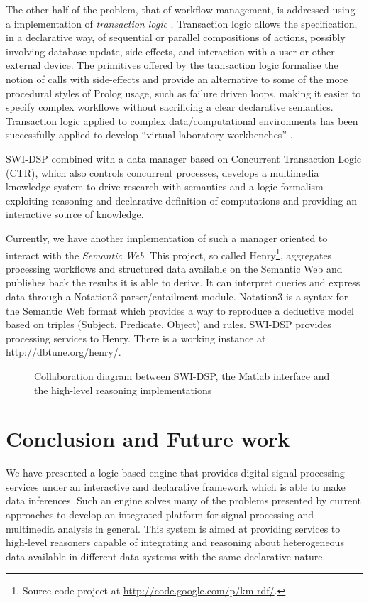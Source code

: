 \documentclass[runningheads]{llncs}
\begin{document}
The other half of the problem, that of workflow management, is addressed using a implementation of \emph{transaction logic} \cite{ctl}. Transaction logic allows the specification, in a declarative way, of sequential or parallel compositions of actions, possibly involving database update, side-effects, and interaction with a user or other external device. The primitives offered by the transaction logic formalise the notion of calls with side-effects and
provide an alternative to some of the more procedural styles of Prolog usage, such as failure driven loops, making it easier to specify complex workflows without sacrificing a clear declarative semantics. Transaction logic applied to complex data/computational environments has been successfully applied to develop ``virtual laboratory workbenches'' \cite{virtual}.

SWI-DSP combined with a data manager based on Concurrent Transaction Logic (CTR), which also controls concurrent processes, develops a multimedia knowledge system to drive research with semantics and a logic formalism exploiting reasoning and declarative definition of computations and providing an interactive source of knowledge.

Currently, we have another implementation of such a manager oriented to interact with the \textit{Semantic Web}. This project, so called Henry\footnote{Source code project at \url{http://code.google.com/p/km-rdf/}.}, aggregates processing workflows and structured data available on the Semantic Web and publishes back the results it is able to derive. It can interpret queries and express data through a Notation3 \cite{n3} parser/entailment module. Notation3 is a syntax for the Semantic Web format which provides a way to reproduce a deductive model based on triples (Subject, Predicate, Object) and rules. SWI-DSP provides processing services to Henry. There is a working instance at \url{http://dbtune.org/henry/}.

\begin{figure}
\centerline{}
\caption{Collaboration diagram between SWI-DSP, the Matlab interface and the high-level reasoning implementations}
\label{fig:reasoners}
\end{figure}

\section{Conclusion and Future work}\label{sec:conclusion}

We have presented a logic-based engine that provides digital signal processing services under an interactive and declarative framework which is able to make data inferences. Such an engine solves many of the problems presented by current approaches to develop an integrated platform for signal processing and multimedia analysis in general. This system is aimed at providing services to high-level reasoners capable of integrating and reasoning about heterogeneous data available in different data systems with the same declarative nature.
\end{document}
